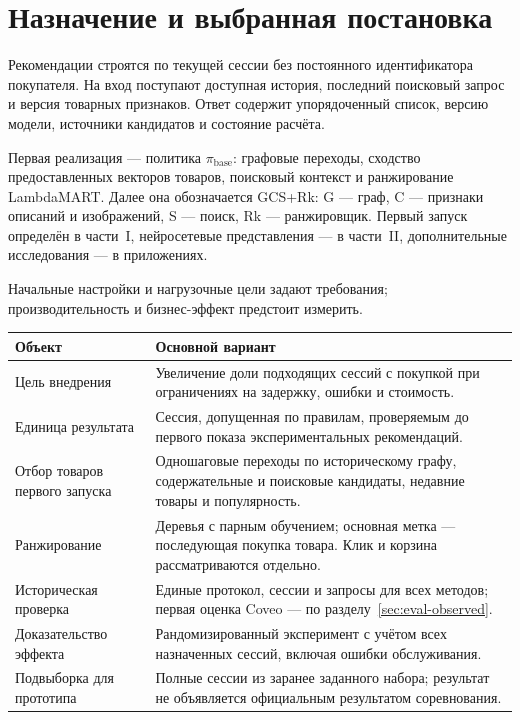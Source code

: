 \documentclass[12pt,a4paper]{article}
\theoremstyle{plainru}
\begin{document}
\section{Назначение и выбранная постановка}\label{sec:scope}

Рекомендации строятся по текущей сессии без постоянного идентификатора
покупателя. На вход поступают доступная история, последний поисковый
запрос и версия товарных признаков. Ответ содержит упорядоченный список,
версию модели, источники кандидатов и состояние расчёта.

Первая реализация --- политика \(\pi_{\mathrm{base}}\): графовые
переходы, сходство предоставленных векторов товаров, поисковый контекст
и ранжирование LambdaMART. Далее она обозначается GCS+Rk:
G --- граф, C --- признаки описаний и изображений,
S --- поиск, Rk --- ранжировщик.
Первый запуск определён в части~I, нейросетевые представления ---
в части~II, дополнительные исследования --- в приложениях.

Начальные настройки и нагрузочные цели задают требования;
производительность и бизнес-эффект предстоит измерить.

\begin{longtable}{L{0.28\textwidth}L{0.64\textwidth}}
\toprule Объект & Основной вариант \\\midrule\endhead
Цель внедрения & Увеличение доли подходящих сессий с покупкой при ограничениях
на задержку, ошибки и стоимость. \\
Единица результата & Сессия, допущенная по правилам, проверяемым до первого
показа экспериментальных рекомендаций. \\
Отбор товаров первого запуска & Одношаговые переходы по историческому
графу, содержательные и поисковые кандидаты, недавние товары и популярность. \\
Ранжирование & Деревья с парным обучением; основная метка --- последующая
покупка товара. Клик и корзина рассматриваются отдельно. \\
Историческая проверка & Единые протокол, сессии и запросы для всех методов;
первая оценка Coveo --- по разделу~\ref{sec:eval-observed}. \\
Доказательство эффекта & Рандомизированный эксперимент с учётом всех
назначенных сессий, включая ошибки обслуживания. \\
Подвыборка для прототипа & Полные сессии из заранее заданного набора;
результат не объявляется официальным результатом соревнования. \\
\bottomrule
\end{longtable}
\end{document}
